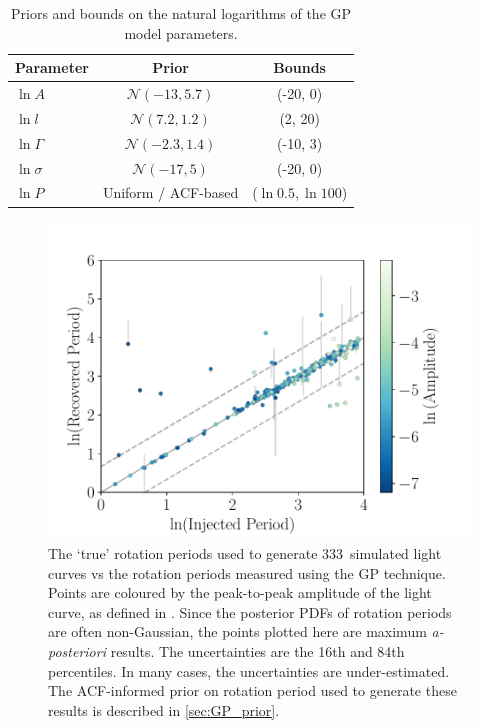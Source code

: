 \documentclass[useAMS, usenatbib, preprint, 12pt]{aastex}
\newcommand{\naigrain}{333}
\begin{document}
\begin{table}
\begin{center}
\caption{Priors and bounds on the natural logarithms of the GP model
    parameters.}
\begin{tabular}{lcc}
Parameter & Prior & Bounds\\
    \hline
    $\ln A$ & $\mathcal N(-13, 5.7)$ & (-20, 0) \\
    $\ln l$ & $\mathcal N(7.2, 1.2)$ & (2, 20) \\
    $\ln \Gamma$ & $\mathcal N(-2.3, 1.4)$ & (-10, 3) \\
    $\ln \sigma$ & $\mathcal N(-17, 5)$ & (-20, 0) \\
    $\ln P $ & Uniform / ACF-based & ($\ln 0.5, \ln 100$) \\
\end{tabular}
\end{center}
\end{table}
\label{tab:priors}

\begin{figure}
\begin{center}
\includegraphics[width=6in, clip=true]{figures/comparison_acfprior_02_13.pdf}
\caption{The `true' rotation periods used to generate \naigrain\
simulated light curves vs the rotation periods measured using the GP
technique.
    Points are coloured by the peak-to-peak amplitude of the light curve, as
    defined in \citet{Aigrain2015}.
Since the posterior PDFs of rotation periods are often non-Gaussian,
    the points plotted here are maximum {\it a-posteriori} results.
The uncertainties are the 16th and 84th percentiles.
In many cases, the uncertainties are under-estimated.
The ACF-informed prior on rotation period used to generate these results is
    described in \textsection \ref{sec:GP_prior}.
    }
\label{fig:compare_mcmc_acfprior}
\end{center}
\end{figure}
\end{document}
